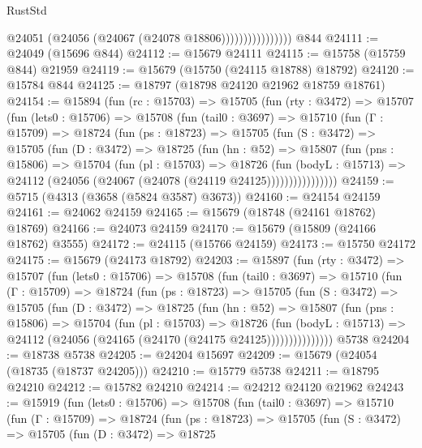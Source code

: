 \begin{lexlean}{RustStd}
\begin{coremodule}
                            @24051 (@24056 (@24067 (@24078 @18806))))))))))))))))
    @844
@24111 := @24049 (@15696 @844)
@24112 := @15679 @24111
@24115 := @15758 (@15759 @844) @21959
@24119 := @15679 (@15750 (@24115 @18788) @18792)
@24120 := @15784 @844
@24125 := @18797 (@18798 @24120 @21962 @18759 @18761)
@24154 := @15894
    (fun (rc : @15703) =>
    @15705
      (fun (rty : @3472) =>
      @15707
        (fun (lets0 : @15706) =>
        @15708
          (fun (tail0 : @3697) =>
          @15710
            (fun (Γ : @15709) =>
            @18724
              (fun (ps : @18723) =>
              @15705
                (fun (S : @3472) =>
                @15705
                  (fun (D : @3472) =>
                  @18725
                    (fun (hn : @52) =>
                    @15807
                      (fun (pns : @15806) =>
                      @15704
                        (fun (pl : @15703) =>
                        @18726
                          (fun (bodyL : @15713) =>
                          @24112 (@24056 (@24067 (@24078 (@24119 @24125))))))))))))))))
@24159 := @5715 (@4313 (@3658 (@5824 @3587) @3673))
@24160 := @24154 @24159
@24161 := @24062 @24159
@24165 := @15679 (@18748 (@24161 @18762) @18769)
@24166 := @24073 @24159
@24170 := @15679 (@15809 (@24166 @18762) @3555)
@24172 := @24115 (@15766 @24159)
@24173 := @15750 @24172
@24175 := @15679 (@24173 @18792)
@24203 := @15897
    (fun (rty : @3472) =>
    @15707
      (fun (lets0 : @15706) =>
      @15708
        (fun (tail0 : @3697) =>
        @15710
          (fun (Γ : @15709) =>
          @18724
            (fun (ps : @18723) =>
            @15705
              (fun (S : @3472) =>
              @15705
                (fun (D : @3472) =>
                @18725
                  (fun (hn : @52) =>
                  @15807
                    (fun (pns : @15806) =>
                    @15704
                      (fun (pl : @15703) =>
                      @18726
                        (fun (bodyL : @15713) =>
                        @24112 (@24056 (@24165 (@24170 (@24175 @24125)))))))))))))))
    @5738
@24204 := @18738 @5738
@24205 := @24204 @15697
@24209 := @15679 (@24054 (@18735 (@18737 @24205)))
@24210 := @15779 @5738
@24211 := @18795 @24210
@24212 := @15782 @24210
@24214 := @24212 @24120 @21962
@24243 := @15919
    (fun (lets0 : @15706) =>
    @15708
      (fun (tail0 : @3697) =>
      @15710
        (fun (Γ : @15709) =>
        @18724
          (fun (ps : @18723) =>
          @15705
            (fun (S : @3472) =>
            @15705
              (fun (D : @3472) =>
              @18725

\end{coremodule}
\end{lexlean}
